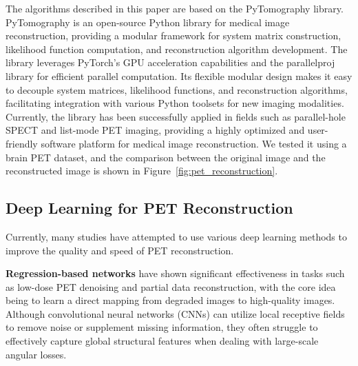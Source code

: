 \documentclass[
reprint,
superscriptaddress,
nofootinbib,
amsmath,amssymb,
aps,
prd,
]{revtex4-2}
\begin{document}
The algorithms described in this paper are based on the PyTomography library\cite{POLSON2025102020}. PyTomography is an open-source Python library for medical image reconstruction, providing a modular framework for system matrix construction, likelihood function computation, and reconstruction algorithm development. The library leverages PyTorch's GPU acceleration capabilities and the parallelproj library for efficient parallel computation. Its flexible modular design makes it easy to decouple system matrices, likelihood functions, and reconstruction algorithms, facilitating integration with various Python toolsets for new imaging modalities. Currently, the library has been successfully applied in fields such as parallel-hole SPECT and list-mode PET imaging, providing a highly optimized and user-friendly software platform for medical image reconstruction. We tested it using a brain PET dataset, and the comparison between the original image and the reconstructed image is shown in Figure~\ref{fig:pet_reconstruction}.



\subsection{Deep Learning for PET Reconstruction}

Currently, many studies have attempted to use various deep learning methods to improve the quality and speed of PET reconstruction.

\textbf{Regression-based networks} have shown significant effectiveness in tasks such as low-dose PET denoising and partial data reconstruction\cite{Kandarpa_2021}, with the core idea being to learn a direct mapping from degraded images to high-quality images. Although convolutional neural networks (CNNs) can utilize local receptive fields to remove noise or supplement missing information, they often struggle to effectively capture global structural features when dealing with large-scale angular losses.
\end{document}
